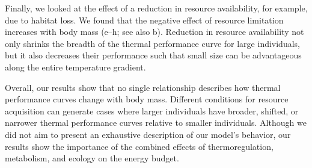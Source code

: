 Finally, we looked at the effect of a reduction in resource availability, for example, due to habitat loss.
We found that the negative effect of resource limitation increases with body mass (e--h; see also b).
Reduction in resource availability not only shrinks the breadth of the thermal performance curve for large individuals, but it also decreases their performance such that small size can be advantageous along the entire temperature gradient.

Overall, our results show that no single relationship describes how thermal performance curves change with body mass.
Different conditions for resource acquisition can generate cases where larger individuals have broader, shifted, or narrower thermal performance curves relative to smaller individuals.
Although we did not aim to present an exhaustive description of our model's behavior, our results show the importance of the combined effects of thermoregulation, metabolism, and ecology on the energy budget.
